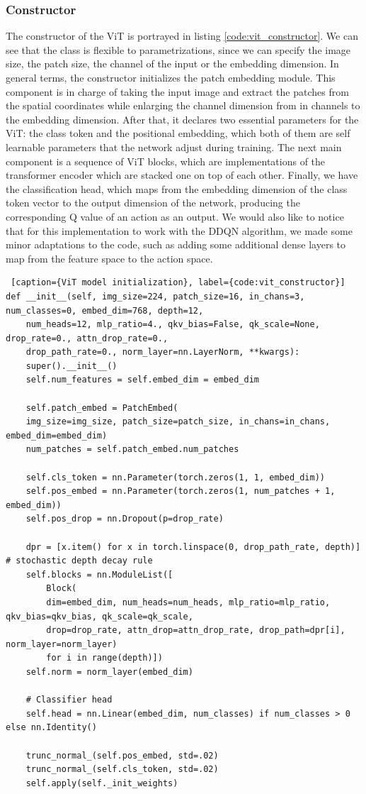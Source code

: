 \subsubsection{Constructor}
The constructor of the ViT is portrayed in listing \ref{code:vit_constructor}. We can see that the class is flexible to parametrizations, since we can specify the image size, the patch size, the channel of the input or the embedding dimension. In general terms, the constructor initializes the patch embedding module. This component is in charge of taking the input image and extract the patches from the spatial coordinates while enlarging the channel dimension from in channels to the embedding dimension. After that, it declares two essential parameters for the ViT: the class token and the positional embedding, which both of them are self learnable parameters that the network adjust during training. The next main component is a sequence of ViT blocks, which are implementations of the transformer encoder which are stacked one on top of each other. Finally, we have the classification head, which maps from the embedding dimension of the class token vector to the output dimension of the network, producing the corresponding Q value of an action as an output. We would also like to notice that for this implementation to work with the DDQN algorithm, we made some minor adaptations to the code, such as adding some additional dense layers to map from the feature space to the action space.

\begin{lstlisting} [caption={ViT model initialization}, label={code:vit_constructor}]
def __init__(self, img_size=224, patch_size=16, in_chans=3, num_classes=0, embed_dim=768, depth=12,
	num_heads=12, mlp_ratio=4., qkv_bias=False, qk_scale=None, drop_rate=0., attn_drop_rate=0.,
	drop_path_rate=0., norm_layer=nn.LayerNorm, **kwargs):
	super().__init__()
	self.num_features = self.embed_dim = embed_dim
	
	self.patch_embed = PatchEmbed(
	img_size=img_size, patch_size=patch_size, in_chans=in_chans, embed_dim=embed_dim)
	num_patches = self.patch_embed.num_patches
	
	self.cls_token = nn.Parameter(torch.zeros(1, 1, embed_dim))
	self.pos_embed = nn.Parameter(torch.zeros(1, num_patches + 1, embed_dim))
	self.pos_drop = nn.Dropout(p=drop_rate)
	
	dpr = [x.item() for x in torch.linspace(0, drop_path_rate, depth)]  # stochastic depth decay rule
	self.blocks = nn.ModuleList([
		Block(
		dim=embed_dim, num_heads=num_heads, mlp_ratio=mlp_ratio, qkv_bias=qkv_bias, qk_scale=qk_scale,
		drop=drop_rate, attn_drop=attn_drop_rate, drop_path=dpr[i], norm_layer=norm_layer)
		for i in range(depth)])
	self.norm = norm_layer(embed_dim)
	
	# Classifier head
	self.head = nn.Linear(embed_dim, num_classes) if num_classes > 0 else nn.Identity()
	
	trunc_normal_(self.pos_embed, std=.02)
	trunc_normal_(self.cls_token, std=.02)
	self.apply(self._init_weights)
\end{lstlisting}

